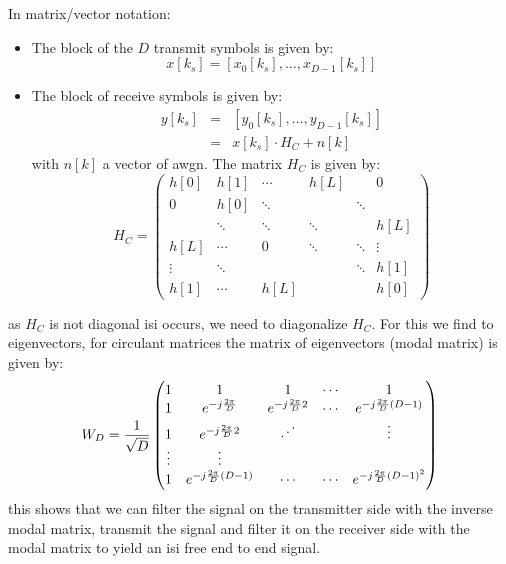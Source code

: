 In matrix/vector notation:
\begin{itemize}
    \item The block of the $D$ transmit symbols is given by:
        \begin{equation}
            x[k_s] = \left[x_0[k_s], \ldots, x_{D-1}[k_s]\right]
        \end{equation}
    \item The block of receive symbols is given by:
        \begin{eqnarray}
            y[k_s] &=& \left[y_0[k_s], \ldots, y_{D-1}[k_s]\right] \\
                &=& x[k_s] \cdot H_C + n[k]
        \end{eqnarray}
        with $n[k]$ a vector of \ac{awgn}. The matrix $H_C$ is given by:
        \begin{equation}
            H_C = \begin{pmatrix}
                h[0] & h[1] & \cdots & h[L] & & 0 \\
                0 & h[0] & \ddots & & \ddots\\
                  & \ddots & \ddots & \ddots & & h[L] \\
                h[L] & \cdots & 0 & \ddots & \ddots & \vdots \\
                \vdots & \ddots & & & \ddots & h[1] \\
                h[1] & \cdots & h[L]  & & & h[0]
            \end{pmatrix}
        \end{equation}
\end{itemize}
as $H_C$ is not diagonal \ac{isi} occurs, we need to diagonalize $H_C$. For
this we find to eigenvectors, for circulant matrices the matrix of eigenvectors
(modal matrix) is given by:
\begin{equation}
    W_D = \frac{1}{\sqrt{D}} \begin{pmatrix}
        1 & 1 & 1 & \cdots & 1 \\
        1 & e^{-j\frac{2 \pi}{D}} & e^{-j \frac{2 \pi}{D} 2} & \cdots & e^{-j \frac{2 \pi}{D} (D-1)} \\
        1 & e^{-j \frac{2 \pi}{D} 2} & \text{\reflectbox{$\ddots$}} & & \vdots \\
        \vdots & \vdots \\
        1 & e^{-j \frac{2 \pi}{D} (D-1)} & \cdots & \cdots & e^{-j \frac{2 \pi}{D} {(D-1)}^2}
    \end{pmatrix}
\end{equation}
this shows that we can filter the signal on the transmitter side with the inverse modal
matrix, transmit the signal and filter it on the receiver side with the modal matrix
to yield an \ac{isi} free end to end signal.

